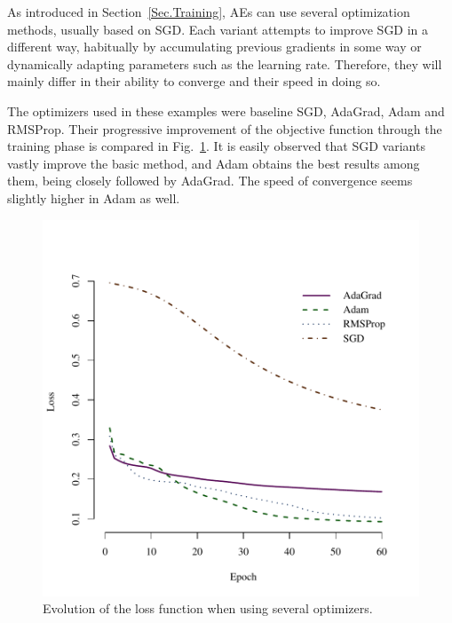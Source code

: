 \documentclass[preprint,5p,compress]{elsarticle}
\begin{document}
As introduced in Section~\ref{Sec.Training}, AEs can use several optimization methods, usually based on SGD. Each variant attempts to improve SGD in a different way, habitually by accumulating previous gradients in some way or dynamically adapting parameters such as the learning rate. Therefore, they will mainly differ in their ability to converge and their speed in doing so.

The optimizers used in these examples were baseline SGD, AdaGrad, Adam and RMSProp. Their progressive improvement of the objective function through the training phase is compared in Fig.~\ref{Fig.opt.loss}. It is easily observed that SGD variants vastly improve the basic method, and Adam obtains the best results among them, being closely followed by AdaGrad. The speed of convergence seems slightly higher in Adam as well.

\begin{figure}[htbp]
  \includegraphics[width=\columnwidth,trim={0 0 0 6em},clip]{optimizers_loss.pdf}
  \caption{\label{Fig.opt.loss}Evolution of the loss function when using several optimizers.}
\end{figure}
\end{document}
